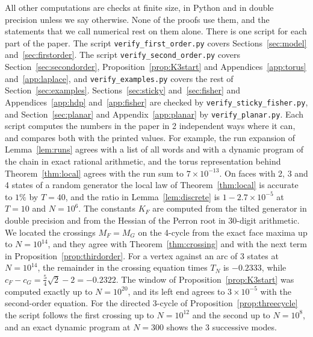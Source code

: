 All other computations are checks at finite size, in Python and in double
precision unless we say otherwise. None of the proofs use them, and the
statements that we call numerical rest on them alone. There is one script
for each part of the paper. The script \texttt{verify\_first\_order.py}
covers Sections~\ref{sec:model} and~\ref{sec:firstorder}. The script
\texttt{verify\_second\_order.py} covers Section~\ref{sec:secondorder},
Proposition~\ref{prop:K3start} and Appendices~\ref{app:torus}
and~\ref{app:laplace}, and \texttt{verify\_examples.py} covers the rest of
Section~\ref{sec:examples}. Sections~\ref{sec:sticky} and~\ref{sec:fisher}
and Appendices~\ref{app:hdp} and~\ref{app:fisher} are checked by
\texttt{verify\_sticky\_fisher.py}, and Section~\ref{sec:planar} and
Appendix~\ref{app:planar} by \texttt{verify\_planar.py}. Each script computes
the numbers in the paper in 2 independent ways where it can, and compares
both with the printed values. For example, the run expansion of
Lemma~\ref{lem:runs} agrees with a list of all words and with a dynamic
program of the chain in exact rational arithmetic, and the torus
representation behind Theorem~\ref{thm:local} agrees with the run sum to
$7\times10^{-13}$. On faces with 2, 3 and 4 states of a random generator the
local law of Theorem~\ref{thm:local} is accurate to $1\%$ by $T=40$, and the
ratio in Lemma~\ref{lem:discrete} is $1-2.7\times10^{-5}$ at $T=10$ and
$N=10^6$. The constants $K_F$ are computed from the tilted generator in
double precision and from the Hessian of the Perron root in 30-digit
arithmetic. We located the crossings $M_F=M_G$ on the 4-cycle from the exact
face maxima up to $N=10^{14}$, and they agree with
Theorem~\ref{thm:crossing} and with the next term in
Proposition~\ref{prop:thirdorder}. For a vertex against an arc of 3 states at
$N=10^{14}$, the remainder in the crossing equation times $T_N$ is
$-0.2333$, while $c_F-c_G=\frac54\sqrt2-2=-0.2322$. The window of
Proposition~\ref{prop:K3start} was computed exactly up to $N=10^{20}$, and its
left end agrees to $3\times10^{-5}$ with the second-order equation. For the
directed 3-cycle of Proposition~\ref{prop:threecycle} the script follows the
first crossing up to $N=10^{12}$ and the second up to $N=10^8$, and an exact
dynamic program at $N=300$ shows the 3 successive modes.

